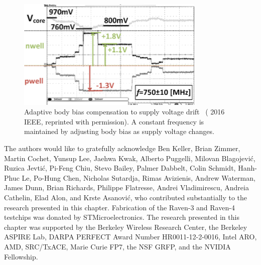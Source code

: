 \documentclass[graybox]{svmult}
\begin{document}
\begin{figure}
  \centering
  \includegraphics[width=0.8\textwidth]{bbgen-results-compensation}
  \caption{Adaptive body bias compensation to supply voltage drift~\cite{Blagojevic2016} ({\textcopyright} 2016 IEEE, reprinted with permission).  A constant frequency is maintained by adjusting body bias as supply voltage changes.}
  \label{fig:bbgen-results-compensation}
\end{figure}

\begin{acknowledgement}
The authors would like to gratefully acknowledge Ben Keller, Brian Zimmer, Martin Cochet, Yunsup Lee, Jaehwa Kwak, Alberto Puggelli, Milovan Blagojevi\'{c}, Ruzica Jevti\'{c}, Pi-Feng Chiu, Stevo Bailey, Palmer Dabbelt, Colin Schmidt, Hanh-Phuc Le, Po-Hung Chen, Nicholas Sutardja, Rimas Avizienis, Andrew Waterman, James Dunn, Brian Richards, Philippe Flatresse, Andrei Vladimirescu, Andreia Cathelin, Elad Alon, and Krste Asanovi\'{c}, who contributed substantially to the research presented in this chapter.
Fabrication of the Raven-3 and Raven-4 testchips was donated by STMicroelectronics.
The research presented in this chapter was supported by the Berkeley Wireless Research Center, the Berkeley ASPIRE Lab, DARPA PERFECT Award Number HR0011-12-2-0016, Intel ARO, AMD, SRC/TxACE, Marie Curie FP7, the NSF GRFP, and the NVIDIA Fellowship.
\end{acknowledgement}



\printbibliography
\end{document}
